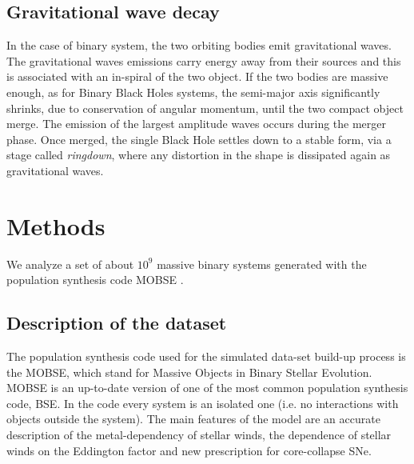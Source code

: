 \documentclass[prb,twocolumn,9pt]{revtex4-1}
\begin{document}
\subsection{Gravitational wave decay}
In the case of binary system, the two orbiting bodies emit gravitational waves. The gravitational waves emissions carry energy away from their sources and this is associated with an in-spiral of the two object.
If the two bodies are massive enough, as for Binary Black Holes systems, the semi-major axis significantly shrinks, due to conservation of angular momentum, until the two compact object merge. The emission of the largest amplitude waves occurs during the merger phase.
Once merged, the single Black Hole settles down to a stable form, via a stage called \textit{ringdown}, where any distortion in the shape is dissipated again as gravitational waves.

\section{Methods}
We analyze a set of about \(10^9\) massive binary systems generated with the population synthesis code MOBSE \cite{2018MNRAS.474.2959G}. 

\subsection{Description of the dataset}
The population synthesis code used for the simulated data-set build-up process is the MOBSE, which stand for Massive Objects in Binary Stellar Evolution. MOBSE is an up-to-date version of one of the most common population synthesis code, BSE. In the code every system is an isolated one (i.e. no interactions with objects outside the system). The main features of the model are an accurate description of the metal-dependency of stellar winds, the dependence of stellar winds on the Eddington factor and new prescription for core-collapse SNe.
\end{document}
